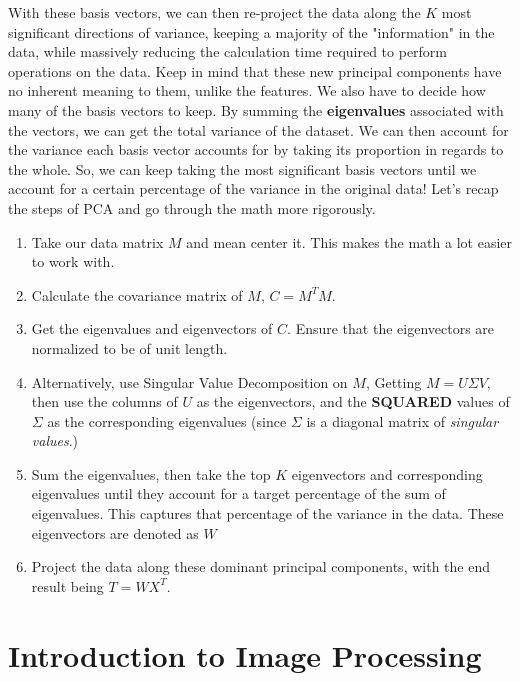 \documentclass{article}
\begin{document}
\newline
\newline

With these basis vectors, we can then re-project the data along the $K$ most significant directions of variance, keeping a majority of the "information" in the data, while massively reducing the calculation time required to perform operations on the data. Keep in mind that these new principal components have no inherent meaning to them, unlike the features. We also have to decide how many of the basis vectors to keep. By summing the \textbf{eigenvalues} associated with the vectors, we can get the total variance of the dataset. We can then account for the variance each basis vector accounts for by taking its proportion in regards to the whole. So, we can keep taking the most significant basis vectors until we account for a certain percentage of the variance in the original data! Let's recap the steps of PCA and go through the math more rigorously. 
\begin{enumerate}
    \item Take our data matrix $M$ and mean center it. This makes the math a lot easier to work with.
    \item Calculate the covariance matrix of $M$, $C = M^TM$.
    \item Get the eigenvalues and eigenvectors of $C$. Ensure that the eigenvectors are normalized to be of unit length. 
    \item Alternatively, use Singular Value Decomposition on $M$, Getting $M = U\Sigma V$, then use the columns of $U$ as the eigenvectors, and the \textbf{SQUARED} values of $\Sigma$ as the corresponding eigenvalues (since $\Sigma$ is a diagonal matrix of \textit{singular values}.)
    \item Sum the eigenvalues, then take the top $K$ eigenvectors and corresponding eigenvalues until they account for a target percentage of the sum of eigenvalues. This captures that percentage of the variance in the data. These eigenvectors are denoted as $W$
    \item Project the data along these dominant principal components, with the end result being $T = WX^T$.
\end{enumerate}
\section{Introduction to Image Processing}
\end{document}
